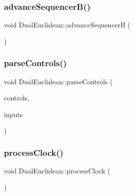 \subsubsection{\texorpdfstring{advance\+Sequencer\+B()}{advanceSequencerB()}}
{\footnotesize\ttfamily void Dual\+Euclidean\+::advance\+SequencerB (\begin{DoxyParamCaption}\item[{void}]{ }\end{DoxyParamCaption})}

\mbox{\label{class_dual_euclidean_ab18b3a9c1a51e7f47d6fc3c6fd26ef4a}} 
\subsubsection{\texorpdfstring{parse\+Controls()}{parseControls()}}
{\footnotesize\ttfamily void Dual\+Euclidean\+::parse\+Controls (\begin{DoxyParamCaption}\item[{\mbox{\hyperlink{class_via_controls}{Via\+Controls}} $\ast$}]{controls,  }\item[{\mbox{\hyperlink{class_via_input_streams}{Via\+Input\+Streams}} $\ast$}]{inputs }\end{DoxyParamCaption})}

\mbox{\label{class_dual_euclidean_a546f3720e1120c3ff547f330287fefde}} 
\subsubsection{\texorpdfstring{process\+Clock()}{processClock()}}
{\footnotesize\ttfamily void Dual\+Euclidean\+::process\+Clock (\begin{DoxyParamCaption}\item[{void}]{ }\end{DoxyParamCaption})}

\mbox{\label{class_dual_euclidean_afed6b5eb3ac657c75b1d158ee53d1d84}} 
